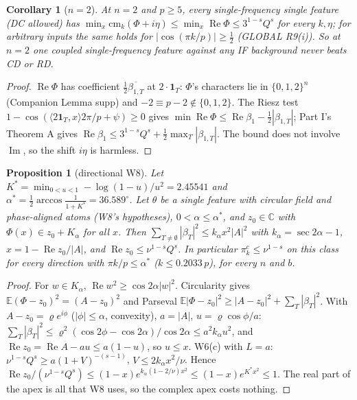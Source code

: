 \documentclass[11pt]{article}
\newtheorem{proposition}[theorem]{Proposition}
\newtheorem{corollary}[theorem]{Corollary}
\theoremstyle{remark}
\newcommand{\E}{\mathbb E}
\newcommand{\Re}{\operatorname{Re}}
\newcommand{\Im}{\operatorname{Im}}
\renewcommand{\Re}{\operatorname{Re}}
\renewcommand{\Im}{\operatorname{Im}}
\begin{document}
\begin{corollary}[$n=2$]\label{cor:n2}
At $n=2$ and $p\ge5$, every single-\emph{frequency} single feature (DC allowed) has $\min_x\mathrm{cm}_k(\Phi+i\eta)\le
\min_x\Re\Phi\le3^{1-s}Q^s$ for every $k,\eta$; for arbitrary inputs the same holds for $|\cos(\pi k/p)|\ge\frac12$ (GLOBAL R9(i)).  So at
$n=2$ one coupled single-frequency feature against any IF background never beats CD or RD.
\end{corollary}
\begin{proof}
$\Re\Phi$ has coefficient $\frac12\overline{\beta_{1,T}}$ at $2\cdot\mathbf 1_T$: $\Phi$'s characters lie in $\{0,1,2\}^n$ (Companion Lemma
supp) and $-2\equiv p-2\notin\{0,1,2\}$.  The Riesz test $1-\cos(\langle2\mathbf 1_T,x\rangle2\pi/p+\psi)\ge0$ gives
$\min\Re\Phi\le\Re\beta_1-\frac12|\beta_{1,T}|$; Part I's Theorem A gives $\Re\beta_1\le3^{1-s}Q^s+\frac12\max_T|\beta_{1,T}|$.  The bound
does not involve $\Im$, so the shift $i\eta$ is harmless.
\end{proof}

\begin{proposition}[directional W8]\label{prop:W8a}
Let $K^*=\min_{0<u<1}-\log(1-u)/u^2=2.45541$ and $\alpha^*=\frac12\arccos\frac1{1+K^*}=36.589^\circ$.  Let $\theta$ be a single feature
with circular field and phase-aligned atoms (W8's hypotheses), $0<\alpha\le\alpha^*$, and $z_0\in\mathbb C$ with
$\Phi(x)\in z_0+K_\alpha$ for all $x$.  Then $\sum_{T\ne\emptyset}|\beta_T|^2\le k_\alpha x^2|A|^2$ with $k_\alpha=\sec2\alpha-1$,
$x=1-\Re z_0/|A|$, and $\Re z_0\le\nu^{1-s}Q^s$.  In particular $\pi^c_k\le\nu^{1-s}$ on this class for every direction with
$\pi k/p\le\alpha^*$ ($k\le0.2033\,p$), for every $n$ and $b$.
\end{proposition}
\begin{proof}
For $w\in K_\alpha$, $\Re w^2\ge\cos2\alpha|w|^2$.  Circularity gives $\E(\Phi-z_0)^2=(A-z_0)^2$ and Parseval
$\E|\Phi-z_0|^2\ge|A-z_0|^2+\sum_T|\beta_T|^2$.  With $A-z_0=\varrho e^{i\phi}$ ($|\phi|\le\alpha$, convexity), $a=|A|$, $u=\varrho\cos\phi/a$:
$\sum_T|\beta_T|^2\le\varrho^2(\cos2\phi-\cos2\alpha)/\cos2\alpha\le a^2k_\alpha u^2$, and $\Re z_0=\Re A-au\le a(1-u)$, so $u\le x$.  W6(c)
with $L=a$: $\nu^{1-s}Q^s\ge a(1+V)^{-(s-1)}$, $V\le2k_\alpha x^2/\nu$.  Hence
$\Re z_0/(\nu^{1-s}Q^s)\le(1-x)e^{k_\alpha(1-2/\nu)x^2}\le(1-x)e^{K^*x^2}\le1$.  The real part of the apex is all that W8 uses, so
the complex apex costs nothing.
\end{proof}
\end{document}
